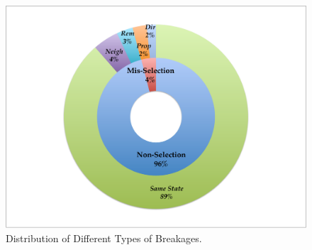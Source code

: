 \begin{figure}[t]
\centering
\includegraphics[trim={0cm 0cm 0cm 0cm},clip,scale=0.23]{images/donut}
\caption{Distribution of Different Types of Breakages.}
\label{donut}
\end{figure}

